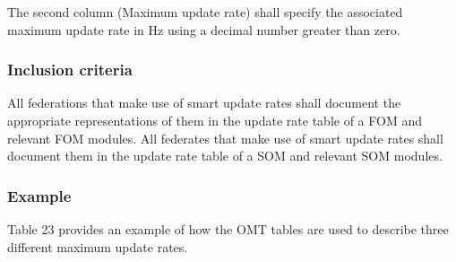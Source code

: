 \newpage
The second column (Maximum update rate) shall specify the associated maximum update rate in Hz using a decimal number greater than zero.

\subsubsection{Inclusion criteria}
All federations that make use of smart update rates shall document the appropriate representations of them in the update rate table of a FOM and relevant FOM modules. All federates that make use of smart update rates shall document them in the update rate table of a SOM and relevant SOM modules.

\subsubsection{Example}
Table 23 provides an example of how the OMT tables are used to describe three different maximum update rates.

\vspace{-9.5pt}
\begingroup
\fontsize{9}{10.9}\selectfont
\setlength{\tabcolsep}{4pt}
\renewcommand{\arraystretch}{1.35}
\noindent{}
\endgroup\vspace{5.8pt}

